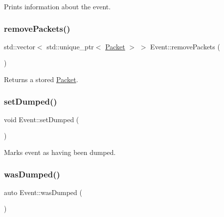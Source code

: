 Prints information about the event. 

\mbox{\label{class_event_a4a7c0f87ea9fd8526451d6eddc3a592e}} 
\subsubsection{\texorpdfstring{remove\+Packets()}{removePackets()}}
{\footnotesize\ttfamily std\+::vector$<$ std\+::unique\+\_\+ptr$<$ \hyperlink{class_packet}{Packet} $>$ $>$ Event\+::remove\+Packets (\begin{DoxyParamCaption}{ }\end{DoxyParamCaption})}



Returns a stored \hyperlink{class_packet}{Packet}. 

\mbox{\label{class_event_ae0c56d36ba53360683e0917e4caac6ed}} 
\subsubsection{\texorpdfstring{set\+Dumped()}{setDumped()}}
{\footnotesize\ttfamily void Event\+::set\+Dumped (\begin{DoxyParamCaption}{ }\end{DoxyParamCaption})\hspace{0.3cm}{\ttfamily [inline]}}



Marks event as having been dumped. 

\mbox{\label{class_event_a51ba784cf88a5f581d426e9a8c6f4764}} 
\subsubsection{\texorpdfstring{was\+Dumped()}{wasDumped()}}
{\footnotesize\ttfamily auto Event\+::was\+Dumped (\begin{DoxyParamCaption}{ }\end{DoxyParamCaption})\hspace{0.3cm}{\ttfamily [inline]}}



